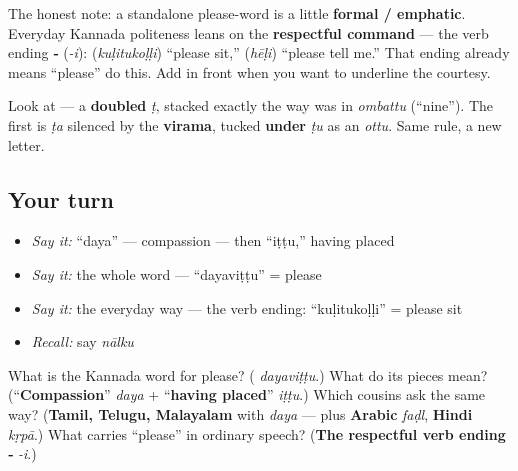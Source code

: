 \begin{culture}
The honest note: a standalone please-word is a little \textbf{formal / emphatic}. Everyday Kannada politeness leans on the \textbf{respectful command} — the verb ending \textbf{‑} (\emph{-i}): \textbf{} (\emph{kuḷitukoḷḷi}) \textquotedblleft{}please sit,\textquotedblright{}  \textbf{} (\emph{hēḷi}) \textquotedblleft{}please tell me.\textquotedblright{} That ending already means \textquotedblleft{}please\textquotedblright{} do this. Add \textbf{} in front when you want to underline the courtesy.
\end{culture}

\begin{sounds}
Look at \textbf{} — a \textbf{doubled} \emph{ṭ}, stacked exactly the way \textbf{} was in \emph{ombattu} (\textquotedblleft{}nine\textquotedblright{}). The first \textbf{} is \emph{ṭa} silenced by the \textbf{virama}, tucked \textbf{under} \textbf{} \emph{ṭu} as an \emph{ottu}. Same rule, a new letter.
\end{sounds}

\subsection*{Your turn}
\begin{itemize}
\raggedright
  \item \emph{Say it:} \textquotedblleft{}daya\textquotedblright{} — compassion — then \textquotedblleft{}iṭṭu,\textquotedblright{} having placed
  \item \emph{Say it:} the whole word — \textquotedblleft{}dayaviṭṭu\textquotedblright{} = please
  \item \emph{Say it:} the everyday way — the verb ending: \textquotedblleft{}kuḷitukoḷḷi\textquotedblright{} = please sit
  \item \emph{Recall:} say \emph{nālku}
\end{itemize}

\begin{tcolorbox}[breakable,colback=teal!4,colframe=teal!35!black,title={Before you move on}]
What is the Kannada word for please? (\textbf{} \emph{dayaviṭṭu}.) What do its pieces mean? (\textquotedblleft{}\textbf{Compassion}\textquotedblright{} \emph{daya} + \textquotedblleft{}\textbf{having placed}\textquotedblright{} \emph{iṭṭu}.) Which cousins ask the same way? (\textbf{Tamil, Telugu, Malayalam} with \emph{daya} — plus \textbf{Arabic} \emph{faḍl}, \textbf{Hindi} \emph{kṛpā}.) What carries \textquotedblleft{}please\textquotedblright{} in ordinary speech? (\textbf{The respectful verb ending ‑} \emph{-i}.)
\end{tcolorbox}
